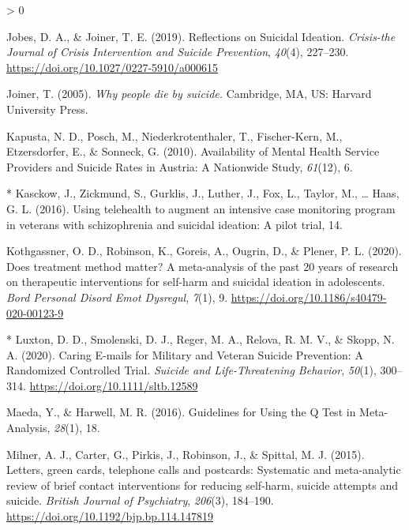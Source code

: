 \documentclass[
  english,
  man]{apa6}
\newlength{\cslhangindent}
\newenvironment{CSLReferences}[2] %
 {%
  \setlength{\parindent}{0pt}
  \ifodd #1 \everypar{\setlength{\hangindent}{\cslhangindent}}\ignorespaces\fi
  \ifnum #2 > 0
  \setlength{\parskip}{#2\baselineskip}
  \fi
 }%
 {}
\begin{document}
\begin{CSLReferences}{1}{0}
\leavevmode\hypertarget{ref-jobes2019}{}%
Jobes, D. A., \& Joiner, T. E. (2019). Reflections on {Suicidal Ideation}. \emph{Crisis-the Journal of Crisis Intervention and Suicide Prevention}, \emph{40}(4), 227--230. \url{https://doi.org/10.1027/0227-5910/a000615}

\leavevmode\hypertarget{ref-joiner2005}{}%
Joiner, T. (2005). \emph{Why people die by suicide.} {Cambridge, MA, US}: {Harvard University Press}.

\leavevmode\hypertarget{ref-kapusta2010}{}%
Kapusta, N. D., Posch, M., Niederkrotenthaler, T., Fischer-Kern, M., Etzersdorfer, E., \& Sonneck, G. (2010). Availability of {Mental Health Service Providers} and {Suicide Rates} in {Austria}: A {Nationwide Study}, \emph{61}(12), 6.

\leavevmode\hypertarget{ref-kasckow2016}{}%
* Kasckow, J., Zickmund, S., Gurklis, J., Luther, J., Fox, L., Taylor, M., \ldots{} Haas, G. L. (2016). Using telehealth to augment an intensive case monitoring program in veterans with schizophrenia and suicidal ideation: A pilot trial, 14.

\leavevmode\hypertarget{ref-kothgassner2020}{}%
Kothgassner, O. D., Robinson, K., Goreis, A., Ougrin, D., \& Plener, P. L. (2020). Does treatment method matter? A meta-analysis of the past 20 years of research on therapeutic interventions for self-harm and suicidal ideation in adolescents. \emph{Bord Personal Disord Emot Dysregul}, \emph{7}(1), 9. \url{https://doi.org/10.1186/s40479-020-00123-9}

\leavevmode\hypertarget{ref-luxton2020}{}%
* Luxton, D. D., Smolenski, D. J., Reger, M. A., Relova, R. M. V., \& Skopp, N. A. (2020). Caring {E}‐mails for {Military} and {Veteran Suicide Prevention}: A {Randomized Controlled Trial}. \emph{Suicide and Life-Threatening Behavior}, \emph{50}(1), 300--314. \url{https://doi.org/10.1111/sltb.12589}

\leavevmode\hypertarget{ref-maeda2016}{}%
Maeda, Y., \& Harwell, M. R. (2016). Guidelines for {Using} the {Q Test} in {Meta}-{Analysis}, \emph{28}(1), 18.

\leavevmode\hypertarget{ref-milner2015}{}%
Milner, A. J., Carter, G., Pirkis, J., Robinson, J., \& Spittal, M. J. (2015). Letters, green cards, telephone calls and postcards: Systematic and meta-analytic review of brief contact interventions for reducing self-harm, suicide attempts and suicide. \emph{British Journal of Psychiatry}, \emph{206}(3), 184--190. \url{https://doi.org/10.1192/bjp.bp.114.147819}


\end{CSLReferences}
\end{document}
